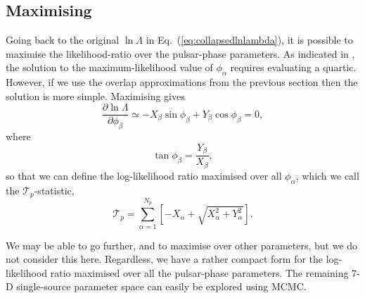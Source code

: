 \documentclass[prd,twocolumn,showpacs,nofootinbib]{revtex4}
\begin{document}






\subsection{Maximising}

Going back to the original $\ln\Lambda$ in Eq.\ (\ref{eq:collapsedlnlambda}), it is possible to maximise the likelihood-ratio over the pulsar-phase parameters. As indicated in \citet{ellisoptimal2012}, the solution to the maximum-likelihood value of $\phi
_{\alpha}$ requires evaluating a quartic. However, if we use the overlap approximations from the previous section then the solution is more simple. Maximising gives
\begin{equation}
\frac{\partial\ln\Lambda}{\partial\phi_{\beta}} \simeq -X_{\beta}\sin\phi_{\beta} + Y_{\beta}\cos\phi_{\beta}=0,
\end{equation}
where
\begin{equation}
\tan\phi_{\beta}=\frac{Y_{\beta}}{X_{\beta}},
\end{equation}
so that we can define the log-likelihood ratio maximised over all $\phi_{\alpha}$, which we call the $\mathcal{T}_p$-statistic,
\begin{equation}
\mathcal{T}_p = \sum_{\alpha=1}^{N_p}\left[-X_{\alpha} + \sqrt{X_{\alpha}^2+Y_{\alpha}^2}\right].
\end{equation}

We may be able to go further, and to maximise over other parameters, but we do not consider this here. Regardless, we have a rather compact form for the log-likelihood ratio maximised over all the pulsar-phase parameters. The remaining $7$-D single-source parameter space can easily be explored using MCMC.
\end{document}
